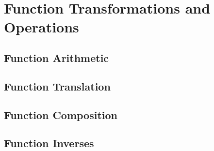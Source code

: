 \section{Function Transformations and Operations}\label{sect:function transformations and operations}




\subsection{Function Arithmetic}\label{sect:function arithmetic}

\subsection{Function Translation}\label{sect:function translation}

\subsection{Function Composition}\label{sect:function composition}

\subsection{Function Inverses}\label{sect:function inverses}
